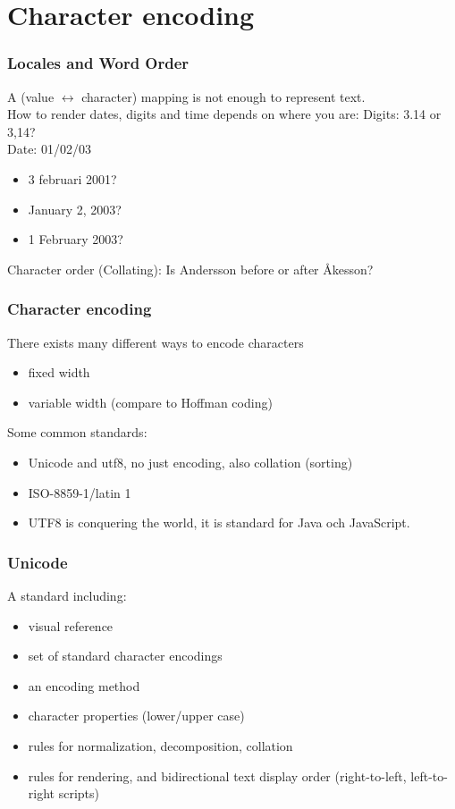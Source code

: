 \section{Character encoding}

\begin{frame}
\frametitle{Locales and Word Order}
\color{structure}
A (value $ \leftrightarrow $ character) mapping is not enough to represent text.\\
How to render dates, digits and time depends on where you are:
Digits: 3.14 or 3,14?\\
Date: 01/02/03\\
\begin{itemize}\color{structure}
\item 3 februari 2001?
\item January 2, 2003?
\item 1 February 2003?
\end{itemize}
Character order (Collating): Is Andersson before or after Åkesson?
\end{frame}

\begin{frame}[fragile]
\frametitle{Character encoding}
\color{structure}
There exists many different ways to encode characters
\begin{itemize}\color{structure}
  \item fixed width
  \item variable width (compare to Hoffman coding)
\end{itemize}
Some common standards:
\begin{itemize}\color{structure}
  \item Unicode and utf8, no just encoding, also collation (sorting)
  \item ISO-8859-1/latin 1
  \item UTF8 is conquering the world, it is standard for Java och JavaScript.
\end{itemize}
\end{frame}

\begin{frame}[fragile]
\frametitle{Unicode}
\color{structure}
A standard including:
\begin{itemize}\color{structure}
  \item visual reference
  \item set of standard character encodings
  \item an encoding method
  \item character properties (lower/upper case)
  \item rules for normalization, decomposition, collation
  \item rules for rendering, and bidirectional text display order (right-to-left, left-to-right scripts)
\end{itemize}
\end{frame}

